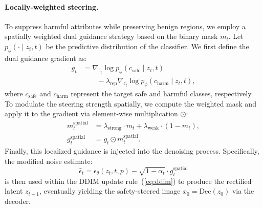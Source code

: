 


\paragraph{Locally-weighted steering.}
To suppress harmful attributes while preserving benign regions, we employ a spatially weighted dual guidance strategy based on the binary mask $m_t$.
Let $p_{\phi}(\cdot \mid z_t, t)$ be the predictive distribution of the classifier.
We first define the dual guidance gradient as:
\begin{align}
\label{eq:dual_gradient}
g_t &= \nabla_{z_t}\log p_\phi(c_{\mathrm{safe}}\mid z_t,t) \nonumber \\
&\quad\quad -\lambda_{\mathrm{rep}}\nabla_{z_t}\log p_\phi(c_{\mathrm{harm}}\mid z_t,t),
\end{align}
where $c_{\mathrm{safe}}$ and $c_{\mathrm{harm}}$ represent the target safe and harmful classes, respectively.
To modulate the steering strength spatially, we compute the weighted mask and apply it to the gradient via element-wise multiplication $\odot$:
\begin{align}
\label{eq:dual_gradient_spatial}
m_{t}^{\mathrm{spatial}} &= \lambda_{\mathrm{strong}} \cdot m_{t}
+ \lambda_{\mathrm{weak}} \cdot (1-m_{t}), \\
g_{t}^{\mathrm{spatial}} &= g_t \odot m_{t}^{\mathrm{spatial}}.
\end{align}
Finally, this localized guidance is injected into the denoising process.
Specifically, the modified noise estimate:
\begin{equation}\label{eq:ddim_noise_new}
\hat{\epsilon}_t=\epsilon_\theta(z_t,t,p)-\sqrt{1-\alpha_t} \cdot g_t^{\mathrm{spatial}}
\end{equation}
is then used within the DDIM update rule~(\ref{eq:ddim}) to produce the rectified latent $z_{t-1}$, eventually yielding the safety-steered image $x_0 = \mathrm{Dec}(z_0)$ via the decoder.



